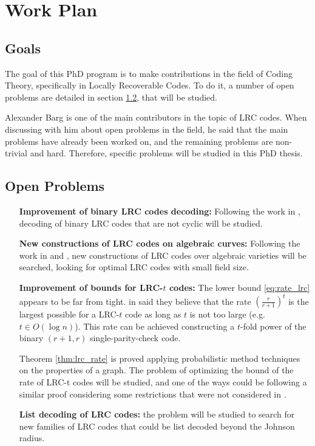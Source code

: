 \chapter{Work Plan}
\section{Goals}
The goal of this PhD program is to make contributions in the field of Coding Theory, specifically in Locally Recoverable Codes. To do it, a number of open problems are detailed in section \ref{sec:open_probl}, that will be studied.

Alexander Barg is one of the main contributors in the topic of LRC codes. When discussing with him about open problems in the field, he said that the main problems have already been worked on, and the remaining problems are non-trivial and hard. Therefore, specific problems will be studied in this PhD thesis.

\section{Open Problems}
\label{sec:open_probl}
\begin{itemize}[align = left, leftmargin=*]
\item[\textbf{Improvement of binary LRC codes decoding:}] Following the work in \cite{binary_LRC_decoding2}, decoding of binary LRC codes that are not cyclic will be studied.
\item[\textbf{New constructions of LRC codes on algebraic curves:}] Following the work in \cite{LRC_on_alg_curves} and \cite{LRC_on_alg_curves2}, new constructions of LRC codes over algebraic varieties will be searched, looking for optimal LRC codes with small field size.
\item[\textbf{Improvement of bounds for LRC-$t$ codes:}] The lower bound \ref{eq:rate_lrc} appears to be far from tight. \citeauthor{bounds_on_LRC_t} in \cite{bounds_on_LRC_t} said they believe that the rate $\left(\frac{r}{r+1}\right)^t$ is the largest possible for a LRC-$t$ code as long as $t$ is not too large (e.g. $t \in O(\log n)$). This rate can be achieved constructing a $t$-fold power of the binary $(r+1,r)$ single-parity-check code.

Theorem \ref{thm:lrc_rate} is proved applying probabilistic method techniques on the properties of a graph. The problem of optimizing the bound of the rate of LRC-t codes will be studied, and one of the ways could be following a similar proof considering some restrictions that were not considered in \cite{bounds_on_LRC}.

\item[\textbf{List decoding of LRC codes:}] the problem will be studied to search for new families of LRC codes that could be list decoded beyond the Johnson radius.
\end{itemize}


